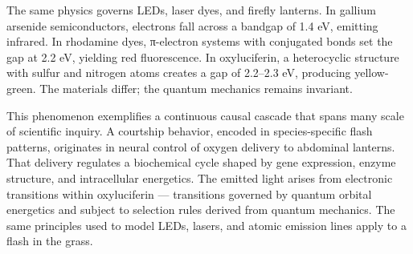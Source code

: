 The same physics governs LEDs, laser dyes, and firefly lanterns. In gallium arsenide semiconductors, electrons fall across a bandgap of 1.4 eV, emitting infrared. In rhodamine dyes, π-electron systems with conjugated bonds set the gap at 2.2 eV, yielding red fluorescence. In oxyluciferin, a heterocyclic structure with sulfur and nitrogen atoms creates a gap of 2.2–2.3 eV, producing yellow-green. The materials differ; the quantum mechanics remains invariant.

This phenomenon exemplifies a continuous causal cascade that spans many scale of scientific inquiry. A courtship behavior, encoded in species-specific flash patterns, originates in neural control of oxygen delivery to abdominal lanterns. That delivery regulates a biochemical cycle shaped by gene expression, enzyme structure, and intracellular energetics. The emitted light arises from electronic transitions within oxyluciferin — transitions governed by quantum orbital energetics and subject to selection rules derived from quantum mechanics. The same principles used to model LEDs, lasers, and atomic emission lines apply to a flash in the grass.


